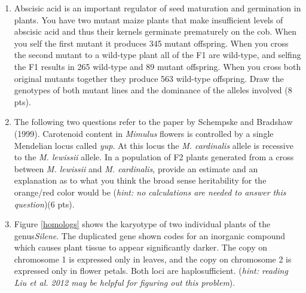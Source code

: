 \documentclass[]{article}
\begin{document}
\begin{enumerate}
\newpage
\item Abscisic acid is an important regulator of seed maturation and germination in plants. You have two mutant maize plants that make insufficient levels of abscisic acid and thus their kernels germinate prematurely on the cob. When you self the first mutant it produces 345 mutant offspring. When you cross the second mutant to a wild-type plant all of the F1 are wild-type, and selfing the F1 results in 265 wild-type and 89 mutant offspring.  When you cross both original mutants together they produce 563 wild-type offspring.  Draw the genotypes of both mutant lines and the dominance of the alleles involved (8 pts).

\newpage
\item The following two questions refer to the paper by Schempske and Bradshaw (1999). 
Carotenoid content in \emph{Mimulus} flowers is controlled by a single Mendelian locus called \emph{yup}. At this locus the \emph{M. cardinalis} allele is recessive to the \emph{M. lewissii} allele. In a population of F2 plants generated from a cross between \emph{M. lewissii}  and \emph{M. cardinalis}, provide an estimate and an explanation as to what you think the broad sense heritability for the orange/red color would be (\emph{hint: no calculations are needed to answer this question})(6 pts).


\newpage
\item Figure \ref{homologs} shows the karyotype of two individual plants of the genus\emph{Silene}.  The duplicated gene shown codes for an inorganic compound which causes plant tissue to appear significantly darker. The copy on chromosome 1 is expressed only in leaves, and the copy on chromosome 2 is expressed only in flower petals. Both loci are haplosufficient. (\emph{hint: reading Liu et al. 2012 may be helpful for figuring out this problem}).


\end{enumerate}
\end{document}
